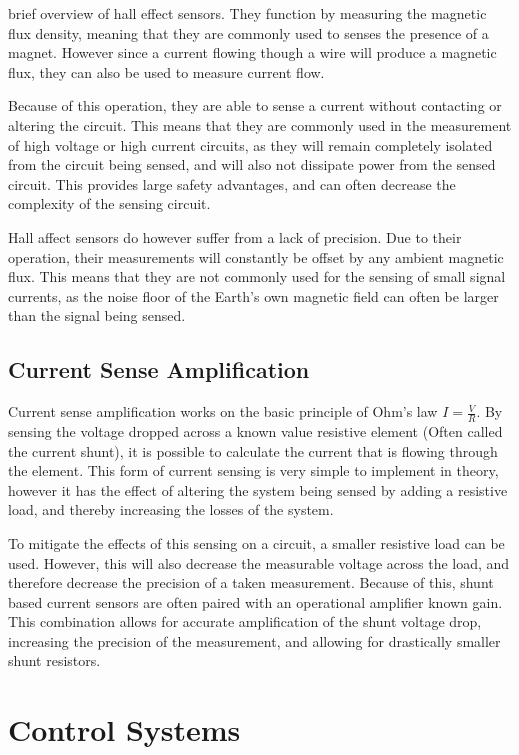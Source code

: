 brief overview of hall effect sensors. They function by measuring the magnetic flux density, meaning that they are commonly used to senses the presence of a magnet. However since a current flowing though a wire will produce a magnetic flux, they can also be used to measure current flow.

Because of this operation, they are able to sense a current without contacting or altering the circuit. This means that they are commonly used in the measurement of high voltage or high current circuits, as they will remain completely isolated from the circuit being sensed, and will also not dissipate power from the sensed circuit. This provides large safety advantages, and can often decrease the complexity of the sensing circuit. 

Hall affect sensors do however suffer from a lack of precision. Due to their operation, their measurements will constantly be offset by any ambient magnetic flux. This means that they are not commonly used for the sensing of small signal currents, as the noise floor of the Earth's own magnetic field can often be larger than the signal being sensed.  


\subsection{Current Sense Amplification}\label{S:current_shunt_back}

Current sense amplification works on the basic principle of Ohm's law $I=\frac{V}{R}$. By sensing the voltage dropped across a known value resistive element (Often called the current shunt), it is possible to calculate the current that is flowing through the element. This form of current sensing is very simple to implement in theory, however it has the effect of altering the system being sensed by adding a resistive load, and thereby increasing the losses of the system. 

To mitigate the effects of this sensing on a circuit, a smaller resistive load can be used. However, this will also decrease the measurable voltage across the load, and therefore decrease the precision of a taken measurement. Because of this, shunt based current sensors are often paired with an operational amplifier known gain. This combination allows for accurate amplification of the shunt voltage drop, increasing the precision of the measurement, and allowing for drastically smaller shunt resistors. 




\section{Control Systems}\label{S:control_back}

